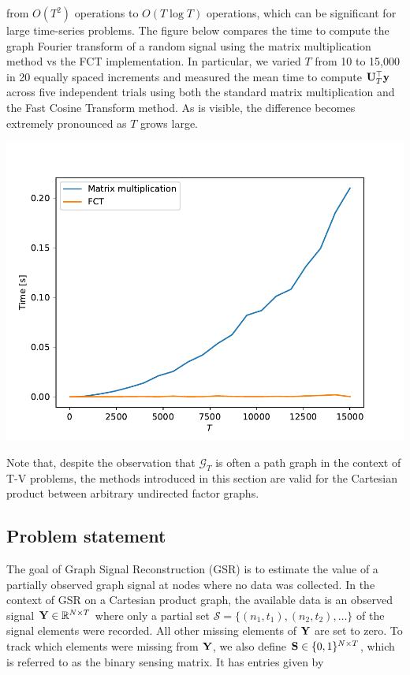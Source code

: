 {    from $O(T^2)$ operations to $O(T \log T)$ operations, which can be significant for large time-series problems. The figure below compares the time to compute the graph Fourier transform of a random signal using the matrix multiplication method vs the FCT implementation. In particular, we varied $T$ from 10 to 15,000 in 20 equally spaced increments and measured the mean time to compute $\mathbf{U}_T^\top \mathbf{y}$ across five independent trials using both the standard matrix multiplication and the Fast Cosine Transform method. As is visible, the difference becomes extremely pronounced as $T$ grows large.

    \begin{center}
        \includegraphics[width=0.9\linewidth]{Figures/DCT.pdf}
    \end{center}



}



Note that, despite the observation that $\mathcal{G}_T$ is often a path graph in the context of T-V problems, the methods introduced in this section are valid for the Cartesian product between arbitrary undirected factor graphs.

\subsection{Problem statement}

\label{sec:problem_statement_2d}


The goal of Graph Signal Reconstruction (GSR) is to estimate the value of a partially observed graph signal at nodes where no data was collected. In the context of GSR on a Cartesian product graph, the available data is an observed signal $\mathbf{Y} \in \mathbb{R}^{N \times T}$ where only a partial set $\mathcal{S} = \{(n_1, t_1), (n_2, t_2), \dots \}$ of the signal elements were recorded. All other missing elements of $\mathbf{Y}$ are set to zero. To track which elements were missing from $\mathbf{Y}$, we also define $\mathbf{S} \in \{0, 1\}^{N \times T}$, which is referred to as the binary sensing matrix. It has entries given by

